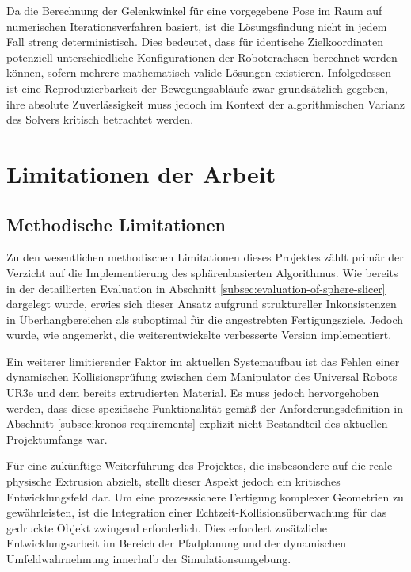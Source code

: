       Da die Berechnung der Gelenkwinkel für eine vorgegebene Pose im Raum auf numerischen Iterationsverfahren basiert, ist die Lösungsfindung nicht in jedem Fall streng deterministisch.
      Dies bedeutet, dass für identische Zielkoordinaten potenziell unterschiedliche Konfigurationen der Roboterachsen berechnet werden können, sofern mehrere mathematisch valide Lösungen existieren.
      Infolgedessen ist eine Reproduzierbarkeit der Bewegungsabläufe zwar grundsätzlich gegeben, ihre absolute Zuverlässigkeit muss jedoch im Kontext der algorithmischen Varianz des Solvers kritisch betrachtet werden.

  \section{Limitationen der Arbeit}\label{sec:thesis-limitations}
    \subsection{Methodische Limitationen}\label{subsec:methodological-limitations}
      Zu den wesentlichen methodischen Limitationen dieses Projektes zählt primär der Verzicht auf die Implementierung des sphärenbasierten Algorithmus.
      Wie bereits in der detaillierten Evaluation in Abschnitt \ref{subsec:evaluation-of-sphere-slicer} dargelegt wurde, erwies sich dieser Ansatz aufgrund struktureller Inkonsistenzen in Überhangbereichen als suboptimal für die angestrebten Fertigungsziele.
      Jedoch wurde, wie angemerkt, die weiterentwickelte verbesserte Version implementiert.

      Ein weiterer limitierender Faktor im aktuellen Systemaufbau ist das Fehlen einer dynamischen Kollisionsprüfung zwischen dem Manipulator des Universal Robots UR3e und dem bereits extrudierten Material.
      Es muss jedoch hervorgehoben werden, dass diese spezifische Funktionalität gemäß der Anforderungsdefinition in Abschnitt \ref{subsec:kronos-requirements} explizit nicht Bestandteil des aktuellen Projektumfangs war.

      Für eine zukünftige Weiterführung des Projektes, die insbesondere auf die reale physische Extrusion abzielt, stellt dieser Aspekt jedoch ein kritisches Entwicklungsfeld dar.
      Um eine prozesssichere Fertigung komplexer Geometrien zu gewährleisten, ist die Integration einer Echtzeit-Kollisionsüberwachung für das gedruckte Objekt zwingend erforderlich.
      Dies erfordert zusätzliche Entwicklungsarbeit im Bereich der Pfadplanung und der dynamischen Umfeldwahrnehmung innerhalb der Simulationsumgebung.

